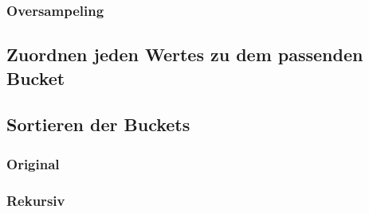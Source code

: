 \subsubsection{Oversampeling}



\subsection{Zuordnen jeden Wertes zu dem passenden Bucket}


\subsection{Sortieren der Buckets}
\subsubsection{Original}
\subsubsection{Rekursiv}
